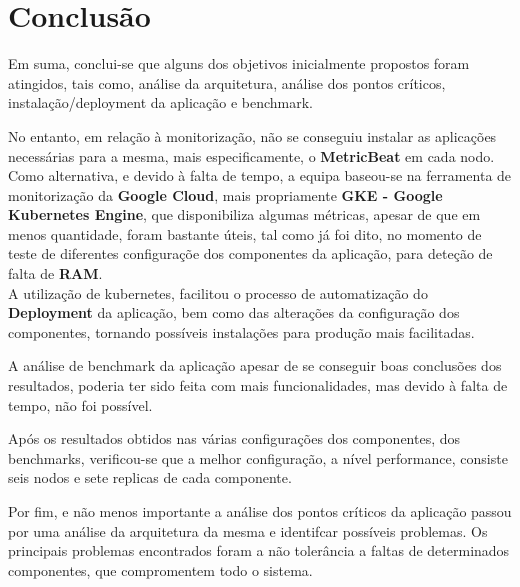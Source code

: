 \chapter{Conclusão}

Em suma, conclui-se que alguns dos objetivos inicialmente propostos foram atingidos, tais como, análise da arquitetura, análise dos pontos críticos, instalação/deployment da aplicação e benchmark.\newline  

No entanto, em relação à monitorização, não se conseguiu instalar as aplicações necessárias para a mesma, mais especificamente, o \textbf{MetricBeat} em cada nodo. \newline Como alternativa, e devido à falta de tempo, a equipa baseou-se na ferramenta de monitorização da \textbf{Google Cloud}, mais propriamente \textbf{GKE - Google Kubernetes Engine}, que disponibiliza algumas métricas, apesar de que em menos quantidade, foram bastante úteis, tal como já foi dito, no momento de teste de diferentes configuraçõe dos componentes da aplicação, para deteção de falta de \textbf{RAM}.\\

A utilização de kubernetes, facilitou o processo de automatização do \textbf{Deployment} da aplicação, bem como das alterações da configuração dos componentes, tornando possíveis instalações para produção mais facilitadas.

A análise de benchmark da aplicação apesar de se conseguir boas conclusões dos resultados, poderia ter sido feita com mais funcionalidades, mas devido à falta de tempo, não foi possível.

Após os resultados obtidos nas várias configurações dos componentes, dos benchmarks, verificou-se que a melhor configuração, a nível performance, consiste seis nodos e sete replicas de cada componente.

Por fim, e não menos importante a análise dos pontos críticos da aplicação passou por uma análise da arquitetura da mesma e identifcar possíveis problemas. Os principais problemas encontrados foram a não tolerância a faltas de determinados componentes, que compromentem todo o sistema.